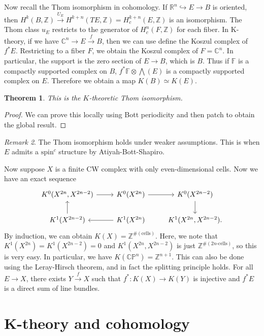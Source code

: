 \documentclass[leqno, openany]{memoir}
\newtheorem{thm}{Theorem}[section]
\theoremstyle{definition}
\theoremstyle{remark}
\newtheorem{rmk}[thm]{Remark}
\theoremstyle{plain}
\theoremstyle{definition}
\theoremstyle{remark}
\newcommand{\R}{\mathbb{R}}
\newcommand{\C}{\mathbb{C}}
\newcommand{\Z}{\mathbb{Z}}
\newcommand{\F}{\mathbb{F}}
\renewcommand{\P}{\mathbb{P}}
\newcommand{\mr}[1]{\mathrm{#1}}
\begin{document}
Now recall the Thom isomorphism in cohomology. If $\R^n \hookrightarrow E \to
B$ is oriented, then $H^k(B, \Z) \xrightarrow{U_E} H^{k+n}(TE, \Z) =
H_c^{k+n}(E, \Z)$ is an isomorphism. The Thom class $u_E$ restricts to the
generator of $H^n_c(F, \Z)$ for each fiber. In K-theory, if we have $\C^n \to E
\xrightarrow{f} B$, then we can use define the Koszul complex of $f^* E$.
Restricting to a fiber $F$, we obtain the Koszul complex of $F = \C^n$. In
particular, the support is the zero section of $E \to B$, which is $B$. Thus if
$\F$ is a compactly supported complex on $B$, $f^* \F \otimes \bigwedge(E)$ is
a compactly supported complex on $E$. Therefore we obtain a map $K(B) \simeq
K(E)$.

\begin{thm} This is the $K$-theoretic Thom isomorphism.  \end{thm}

\begin{proof} We can prove this locally using Bott periodicity and then patch
to obtain the global result.  \end{proof}

\begin{rmk} The Thom isomorphism holds under weaker assumptions. This is when
$E$ admits a $\mr{spin}^c$ structure by Atiyah-Bott-Shapiro.  \end{rmk}

Now suppose $X$ is a finite CW complex with only even-dimensional cells. Now we
have an exact sequence \begin{equation*} \begin{tikzcd} K^0(X^{2n}, X^{2n-2})
    \ar{r} & K^0(X^{2n}) \ar{r} & K^0(X^{2n-2}) \ar{d} \\ K^1(X^{2n-2}) \ar{u}
           & K^1(X^{2n}) \ar{l} & K^1(X^{2n}, X^{2n-2}).  \end{tikzcd}
       \end{equation*} By induction, we can obtain $K(X) =
       \Z^{\#(\text{cells})}$. Here, we note that $K^1(X^{2n}) = K^1(X^{2n-2})
       = 0$ and $K^1(X^{2n}, X^{2n-2})$ is just $\Z^{\#(\text{$2n$-cells})}$,
       so this is very easy. In particular, we have $K(\C\P^n) = \Z^{n+1}$.
       This can also be done using the Leray-Hirsch theorem, and in fact the
       splitting principle holds. For all $E \to X$, there exists $Y
       \xrightarrow{f} X$ such that $f^* \colon K(X) \to K(Y)$ is injective and
       $f^* E$ is a direct sum of line bundles.

\section{K-theory and cohomology}%
\end{document}
